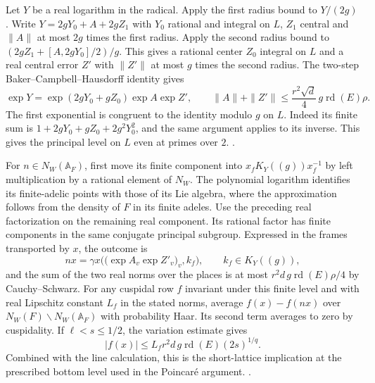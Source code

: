 Let \(Y\) be a real logarithm in the radical. Apply the
first radius bound to \(Y/(2g)\). Write
\(Y=2gY_0+A+2gZ_1\) with \(Y_0\) rational and integral
on \(L\), \(Z_1\) central and \(\|A\|\) at most \(2g\)
times the first radius. Apply the second radius bound
to \((2gZ_1+[A,2gY_0]/2)/g\). This gives a rational
center \(Z_0\) integral on \(L\) and a real central error
\(Z'\) with \(\|Z'\|\) at most \(g\) times the second
radius. The two-step Baker--Campbell--Hausdorff identity
gives
\[
 \exp Y=\exp(2gY_0+gZ_0)\exp A\exp Z',
 \qquad
 \|A\|+\|Z'\|\le \frac{r^2\sqrt d}{4}\,
                         g\operatorname{rd}(E)\rho .
\]
The first exponential is congruent to the identity
modulo \(g\) on \(L\). Indeed its finite sum is
\(1+2gY_0+gZ_0+2g^2Y_0^2\), and the same argument
applies to its inverse. This gives the principal level
on \(L\) even at primes over \(2\).
.

For \(n\in N_W(\mathbb A_F)\), first move its finite
component into \(x_f K_Y((g))x_f^{-1}\) by left
multiplication by a rational element of \(N_W\). The
polynomial logarithm identifies its finite-adelic points
with those of its Lie algebra, where the approximation
follows from the density of \(F\) in its finite adeles. Use the
preceding real factorization on the remaining real
component. Its rational factor has finite components in
the same conjugate principal subgroup. Expressed in the
frames transported by \(x\), the outcome is
\[
 n x=\gamma x\Big(\big(\exp A_v\exp Z'_v\big)_v,k_f\Big),
 \qquad k_f\in K_Y((g)),
\]
and the sum of the two real norms over the places is at most
\(r^2 d\,g\operatorname{rd}(E)\rho/4\) by Cauchy--Schwarz.
For any cuspidal row \(f\) invariant under this finite
level and with real Lipschitz constant \(L_f\) in the
stated norms, average \(f(x)-f(nx)\) over
\(N_W(F)\backslash N_W(\mathbb A_F)\) with probability
Haar. Its second term averages to zero by cuspidality.
If \(\ell<s\le1/2\), the variation estimate gives
\[
  |f(x)|\le L_f r^2 d\,g\operatorname{rd}(E)(2s)^{1/q}.
\]
Combined with the line calculation, this is the
short-lattice implication at the prescribed bottom
level used in the Poincar\'e argument.
.

